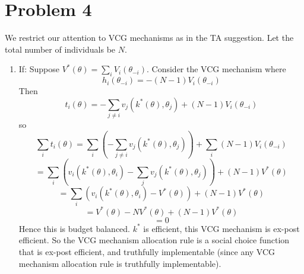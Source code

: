 \documentclass[10pt,letter]{article}
\begin{document}
\section*{Problem 4}
We restrict our attention to VCG mechanisms as in the TA suggestion. Let the total number of individuals be $N$.
\begin{enumerate}[label=(\alph*)]
  \item If: Suppose $V^*(\theta) = \sum_i V_i(\theta_{-i})$. Consider the VCG mechanism where
  \[ h_i(\theta_{-i}) = -(N-1)V_i(\theta_{-i}) \]
  Then
  \[ t_i(\theta) = -\sum_{j \neq i} v_j(k^*(\theta), \theta_j) + (N-1)V_i(\theta_{-i}) \]
  so
  \[ \sum_i t_i(\theta) = \sum_i\left( -\sum_{j \neq i} v_j(k^*(\theta), \theta_j) \right)+ \sum_i (N-1)V_i(\theta_{-i}) \]
  \[ = \sum_i\left(v_i(k^*(\theta), \theta_i) - \sum_{j} v_j(k^*(\theta), \theta_j)\right) + (N-1)V^*(\theta)  \]
  \[ = \sum_i\left(v_i(k^*(\theta), \theta_i) - V^*(\theta)\right) + (N-1)V^*(\theta)\]
  \[ = V^*(\theta) - N V^*(\theta) + (N-1)V^*(\theta)\]
  \[ = 0 \]
  Hence this is budget balanced. $k^*$ is efficient, this VCG mechanism is ex-post efficient. So the VCG mechanism allocation rule is a social choice function that is ex-post efficient, and truthfully implementable (since any VCG mechanism allocation rule is truthfully implementable).


\end{enumerate}
\end{document}
